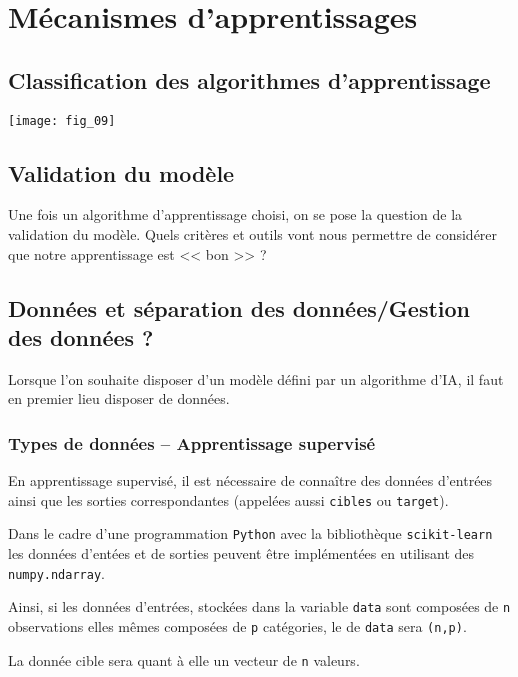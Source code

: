 \section{Mécanismes d'apprentissages}

\subsection{Classification des algorithmes d'apprentissage}

\begin{center}
\texttt{[image: fig\_09]}
\end{center}


\subsection{Validation du modèle}
Une fois un algorithme d'apprentissage choisi, on se pose la question de la validation du modèle. Quels critères et outils vont nous permettre de considérer que notre apprentissage est << bon >> ?

\subsection{Données et séparation des données/Gestion des données ?}
Lorsque l'on souhaite disposer d'un modèle défini par un algorithme d'IA, il faut en premier lieu disposer de données. 

\subsubsection{Types de données -- Apprentissage supervisé}

En apprentissage supervisé, il est nécessaire de connaître des données d'entrées ainsi que les sorties correspondantes (appelées aussi \texttt{cibles} ou \texttt{target}).

Dans le cadre d'une programmation \texttt{Python} avec la bibliothèque \texttt{scikit-learn} les données d'entées et de sorties peuvent être implémentées en utilisant des \texttt{numpy.ndarray}.

Ainsi, si les données d'entrées, stockées dans la variable \texttt{data} sont composées de \texttt{n} observations elles mêmes composées de \texttt{p} catégories, le  de \texttt{data} sera \texttt{(n,p)}.

La donnée cible sera quant à elle un vecteur de \texttt{n} valeurs. 

